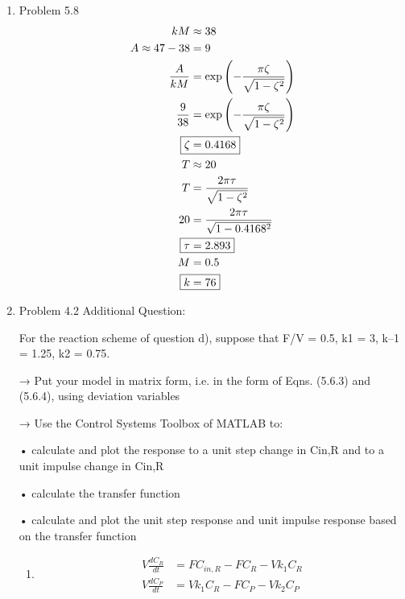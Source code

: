 \documentclass[12pt]{article}
\begin{document}
\begin{enumerate}
\newpage
\item Problem 5.8
\begin{align*}
    kM &\approx 38 \\
    A \approx 47 - 38 &= 9 \\
    \frac{A}{kM} &= \exp{\left(-\frac{\pi\zeta}{\sqrt{1 - \zeta^2}}\right)} \\
    \frac{9}{38} &= \exp{\left(-\frac{\pi\zeta}{\sqrt{1 - \zeta^2}}\right)} \\
    \Aboxed{\zeta &= 0.4168} \\
    T &\approx 20 \\
    T &= \frac{2\pi\tau}{\sqrt{1 - \zeta^2}} \\
    20 &= \frac{2\pi\tau}{\sqrt{1 - 0.4168^2}} \\
    \Aboxed{\tau &= 2.893} \\
    M &= 0.5 \\
    \Aboxed{k &= 76}
\end{align*}

\newpage
\item Problem 4.2
Additional Question:

For the reaction scheme of question d), suppose that F/V = 0.5, k1 = 3, k–1 = 1.25, k2 = 0.75.

→ Put your model in matrix form, i.e. in the form of Eqns. (5.6.3) and (5.6.4), using deviation variables

→ Use the Control Systems Toolbox of MATLAB to:

• calculate and plot the response to a unit step change in Cin,R and to a unit impulse change in Cin,R

• calculate the transfer function

• calculate and plot the unit step response and unit impulse response based on the transfer function

\begin{enumerate}
    \item 
    \begin{align*}
        V \frac{dC_R}{dt} &= F C_{in,R} - F C_R - V k_1 C_R \\
        V \frac{dC_P}{dt} &= V k_1 C_R - F C_P - V k_2 C_P
    \end{align*}
    

\end{enumerate}
\end{enumerate}
\end{document}
